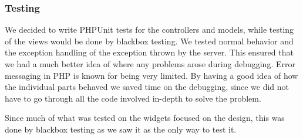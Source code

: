 \subsubsection{Testing}
We decided to write PHPUnit tests for the controllers and models,  while testing of the views would be done by blackbox testing. We tested normal behavior and the exception handling of the exception thrown by the server. This ensured that we had a much better idea of where any problems arose during debugging. Error messaging in PHP is known for being very limited. By having a good idea of how the individual parts behaved we saved time on the debugging, since we did not have to go through all the code involved in-depth to solve the problem.

Since much of what was tested on the widgets focused on the design, this was done by blackbox testing as we saw it as the only way to test it.

